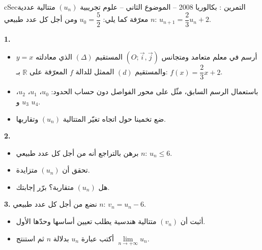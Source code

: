 \documentclass[12pt,a4paper]{article}
\newenvironment{BOX}[2]{\begin{otherlanguage}{english}\begin{arbox}{#1}{#2}}{\end{arbox}\end{otherlanguage}}
\newcounter{exo}
\newenvironment{tamrin}[1]{\stepcounter{exo}\begin{BOX}{cSec}{التمرين \theexo: #1}}{\end{BOX}}
\newcommand{\R}{\mathbb{R}}
\newenvironment{sq}{\begin{itemize}[leftmargin=2.4em,itemsep=3pt]}{\end{itemize}}
\newcommand{\qa}{\item[(أ)]}\newcommand{\qb}{\item[(ب)]}\newcommand{\qc}{\item[(جـ)]}\newcommand{\qd}{\item[(د)]}\newcommand{\qe}{\item[(هـ)]}
\newcommand{\QQ}[1]{\par\smallskip\textbf{#1.} }
\begin{document}
\begin{tamrin}{بكالوريا 2008 -- الموضوع الثاني -- علوم تجريبية}
$(u_n)$ متتالية عددية معرّفة كما يلي: $u_0=\dfrac52$ ومن أجل كل عدد طبيعي $n$: $u_{n+1}=\dfrac23u_n+2$.
\QQ{1}
\begin{sq}
\qa أرسم في معلم متعامد ومتجانس $(O;\vec i,\vec j)$ المستقيم $(\Delta)$ الذي معادلته $y=x$ والمستقيم $(d)$ الممثل للدالة $f$ المعرّفة على $\R$ بـ: $f(x)=\dfrac23x+2$.
\qb باستعمال الرسم السابق، مثّل على محور الفواصل دون حساب الحدود: $u_0$، $u_1$، $u_2$، $u_3$ و $u_4$.
\qc ضع تخمينا حول اتجاه تغيّر المتتالية $(u_n)$ وتقاربها.
\end{sq}
\QQ{2}
\begin{sq}
\qa برهن بالتراجع أنه من أجل كل عدد طبيعي $n$: $u_n\le 6$.
\qb تحقق أن $(u_n)$ متزايدة.
\qc هل $(u_n)$ متقاربة؟ برّر إجابتك.
\end{sq}
\QQ{3} نضع من أجل كل عدد طبيعي $n$: $v_n=u_n-6$.
\begin{sq}
\qa أثبت أن $(v_n)$ متتالية هندسية يطلب تعيين أساسها وحدّها الأول.
\qb أكتب عبارة $u_n$ بدلالة $n$ ثم استنتج $\lim\limits_{n\to+\infty}u_n$.
\end{sq}
\end{tamrin}
\end{document}

